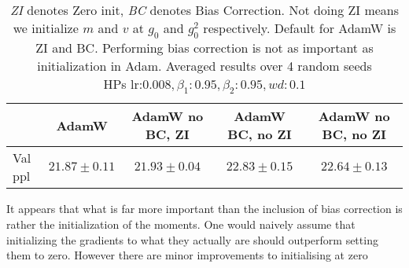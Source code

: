 \documentclass[12pt]{book}
\begin{document}
\begin{table}[h]
\centering
\caption{\textit{ZI} denotes Zero init, \textit{BC} denotes Bias Correction. Not doing ZI means we initialize $m$ and $v$ at $g_0$ and $g_0^2$ respectively. Default for AdamW is ZI and BC. Performing bias correction is not as important as initialization in Adam. Averaged results over 4 random seeds\\
HPs $\text{lr:}0.008, \beta_1:0.95, \beta_2: 0.95, wd:0.1$}
\vspace{0.5em}
\begin{tabular}{lcccc}
\toprule
& AdamW & AdamW no BC, ZI & AdamW BC, no ZI  &AdamW no BC, no ZI  \\
\midrule
Val ppl & $21.87 \pm 0.11$ & $21.93 \pm 0.04$ & $22.83 \pm 0.15$ & $22.64 \pm 0.13$  \\
\bottomrule
\end{tabular}
\end{table}
It appears that what is far more important than the inclusion of bias correction is rather the initialization of the moments. One would naively assume that initializing the gradients to what they actually are should outperform setting them to zero. However there are minor improvements to initialising at zero 
\end{document}
